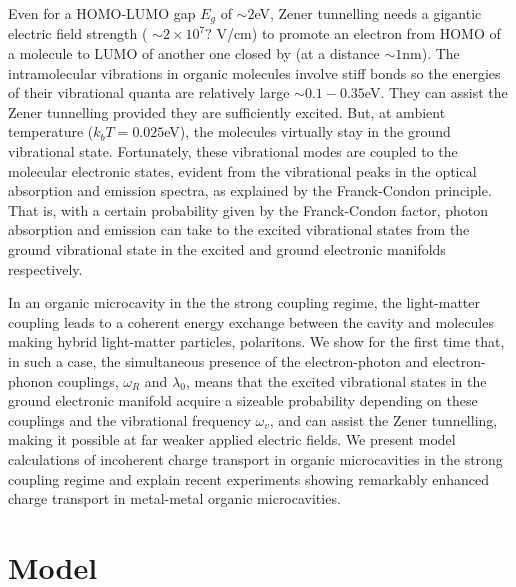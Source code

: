 \documentclass[a4paper,twocolumn]{revtex4-1} %
\begin{document}
Even for a %
HOMO-LUMO gap $E_g$ of $\sim2$eV,
Zener tunnelling needs a gigantic electric field strength
( $\sim 2\times10^{7}?$ V/cm)
 to promote an electron from HOMO of a molecule to
 LUMO of another one closed by (at a distance $\sim1$nm).
 The intramolecular vibrations in organic molecules
 involve stiff bonds so the energies of their vibrational quanta 
 are relatively large $\sim 0.1-0.35$eV. 
 They can assist the Zener tunnelling provided they are sufficiently excited.
 But, at ambient temperature ($k_bT=0.025$eV), 
 the molecules virtually stay in the ground vibrational state.
 Fortunately, these %
  vibrational modes are coupled
  to the molecular electronic states, evident from
  the vibrational peaks in the optical absorption
   and emission spectra, 
   as explained by the Franck-Condon principle.
  That is, with a certain probability given by the Franck-Condon factor, photon absorption and emission can take to the excited vibrational states from the ground vibrational state in the excited and ground electronic manifolds respectively. 
 
 In an organic microcavity in the the strong coupling regime, the light-matter coupling leads to 
 a coherent energy exchange between the cavity and molecules
  making hybrid light-matter particles, polaritons.
 We show for the first time that,
   in such a case, 
  the simultaneous presence of the electron-photon and electron-phonon couplings, $\omega_R$ and $\lambda_0$, means that
   the excited vibrational states
   in the ground electronic manifold acquire a sizeable probability
  depending on
   these couplings
     and the vibrational frequency $\omega_v$,
     and can assist the Zener tunnelling,
      making it possible at far weaker applied electric fields.
    We present model calculations of incoherent charge transport in organic microcavities in the strong coupling regime and
explain recent experiments showing remarkably enhanced charge transport in metal-metal organic microcavities.
  
 
    
 
 
 
 




  
 
 
 
 
  


\section{Model}
\end{document}
